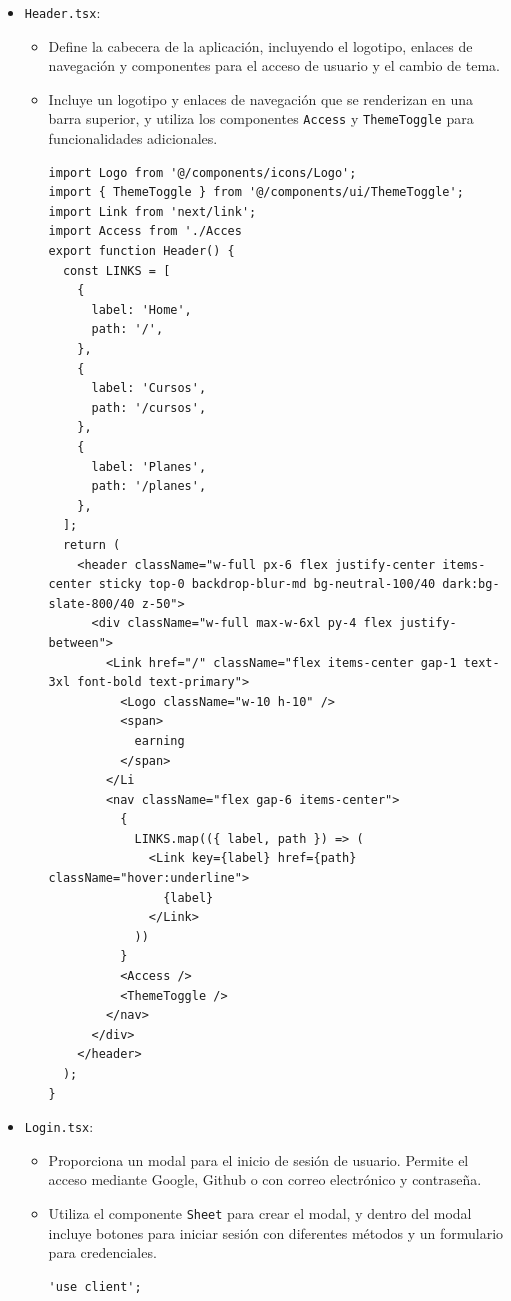\begin{itemize}
  \item \texttt{Header.tsx}:
  \begin{itemize}
      \item Define la cabecera de la aplicación, incluyendo el logotipo, enlaces de navegación y componentes para el acceso de usuario y el cambio de tema.
      \item Incluye un logotipo y enlaces de navegación que se renderizan en una barra superior, y utiliza los componentes \texttt{Access} y \texttt{ThemeToggle} para funcionalidades adicionales.
      \begin{verbatim}
import Logo from '@/components/icons/Logo';
import { ThemeToggle } from '@/components/ui/ThemeToggle';
import Link from 'next/link';
import Access from './Acces
export function Header() {
  const LINKS = [
    {
      label: 'Home',
      path: '/',
    },
    {
      label: 'Cursos',
      path: '/cursos',
    },
    {
      label: 'Planes',
      path: '/planes',
    },
  ];
  return (
    <header className="w-full px-6 flex justify-center items-center sticky top-0 backdrop-blur-md bg-neutral-100/40 dark:bg-slate-800/40 z-50">
      <div className="w-full max-w-6xl py-4 flex justify-between">
        <Link href="/" className="flex items-center gap-1 text-3xl font-bold text-primary">
          <Logo className="w-10 h-10" />
          <span>
            earning
          </span>
        </Li
        <nav className="flex gap-6 items-center">
          {
            LINKS.map(({ label, path }) => (
              <Link key={label} href={path} className="hover:underline">
                {label}
              </Link>
            ))
          }
          <Access />
          <ThemeToggle />
        </nav>
      </div>
    </header>
  );
}
      \end{verbatim}
  \end{itemize}
  
  \item \texttt{Login.tsx}:
  \begin{itemize}
    \item Proporciona un modal para el inicio de sesión de usuario. Permite el acceso mediante Google, Github o con correo electrónico y contraseña.
    \item Utiliza el componente \texttt{Sheet} para crear el modal, y dentro del modal incluye botones para iniciar sesión con diferentes métodos y un formulario para credenciales.
    \begin{verbatim}
'use client';


\end{verbatim}
\end{itemize}
\end{itemize}
